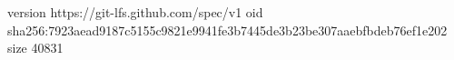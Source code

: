 version https://git-lfs.github.com/spec/v1
oid sha256:7923aead9187c5155c9821e9941fe3b7445de3b23be307aaebfbdeb76ef1e202
size 40831
